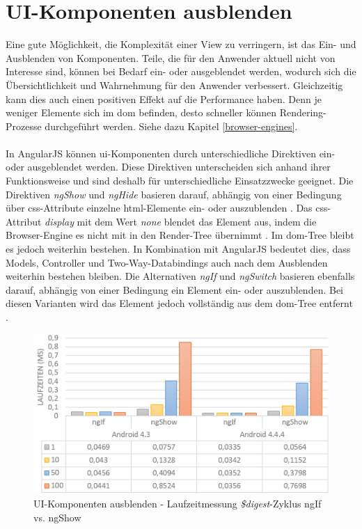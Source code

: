 \section{UI-Komponenten ausblenden}
\label{hidingui-main}
Eine gute Möglichkeit, die Komplexität einer View zu verringern, ist das Ein- und Ausblenden von Komponenten. Teile, die für den Anwender aktuell nicht von Interesse sind, können bei Bedarf ein- oder ausgeblendet werden, wodurch sich die Übersichtlichkeit und Wahrnehmung für den Anwender verbessert. Gleichzeitig kann dies auch einen positiven Effekt auf die Performance haben. Denn je weniger Elemente sich im \gls{dom} befinden, desto schneller können Rendering-Prozesse durchgeführt werden. Siehe dazu Kapitel \ref{browser-engines}. 
\\\\
In AngularJS können \gls{ui}-Komponenten durch unterschiedliche Direktiven ein- oder ausgeblendet werden. Diese Direktiven unterscheiden sich anhand ihrer Funktionsweise und sind deshalb für unterschiedliche Einsatzzwecke geeignet. Die Direktiven \emph{ngShow} und \emph{ngHide} basieren darauf, abhängig von einer Bedingung über \gls{css}-Attribute einzelne \gls{html}-Elemente ein- oder auszublenden \cite{AJSNGIF}. Das \gls{css}-Attribut \emph{display} mit dem Wert \emph{none} blendet das Element aus, indem die Browser-Engine es nicht mit in den Render-Tree übernimmt \cite{hbw}. Im \gls{dom}-Tree bleibt es jedoch weiterhin bestehen. In Kombination mit AngularJS bedeutet dies, dass Models, Controller und Two-Way-Databindings auch nach dem Ausblenden weiterhin bestehen bleiben. Die Alternativen \emph{ngIf} und \emph{ngSwitch} basieren ebenfalls darauf, abhängig von einer Bedingung ein Element ein- oder auszublenden. Bei diesen Varianten wird das Element jedoch vollständig aus dem \gls{dom}-Tree entfernt \cite{AJSNGSHOW}.
\begin{figure}[h]
	\centering
	\includegraphics[scale=0.4]{Bilder/Diagramme/HidingUI-Digest.png}
	\caption{UI-Komponenten ausblenden - Laufzeitmessung \emph{\$digest}-Zyklus ngIf vs. ngShow}
	\label{hiding-ui-digest}
\end{figure}
